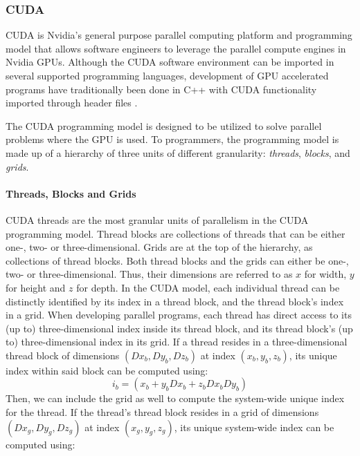 \subsubsection{CUDA} \label{background:graphical_processing_units:cuda}

CUDA \cite{cuda} is Nvidia's general purpose parallel computing platform and programming model that allows software engineers to leverage the parallel compute engines in Nvidia GPUs.
Although the CUDA software environment can be imported in several supported programming languages, development of GPU accelerated programs have traditionally been done in C++ with CUDA functionality imported through header files \cite{cuda}.

The CUDA programming model is designed to be utilized to solve parallel problems where the GPU is used.
To programmers, the programming model is made up of a hierarchy of three units of different granularity: \textit{threads}, \textit{blocks}, and \textit{grids}.

\paragraph{Threads, Blocks and Grids}
CUDA threads are the most granular units of parallelism in the CUDA programming model.
Thread blocks are collections of threads that can be either one-, two- or three-dimensional.
Grids are at the top of the hierarchy, as collections of thread blocks.
Both thread blocks and the grids can either be one-, two- or three-dimensional.
Thus, their dimensions are referred to as $x$ for width, $y$ for height and $z$ for depth.
In the CUDA model, each individual thread can be distinctly identified by its index in a thread block, and the thread block's index in a grid.
When developing parallel programs, each thread has direct access to its (up to) three-dimensional index inside its thread block, and its thread block's (up to) three-dimensional index in its grid.
If a thread resides in a three-dimensional thread block of dimensions $(Dx_b, Dy_b, Dz_b)$ at index $(x_b, y_b, z_b)$, its unique index within said block can be computed using:
\begin{equation}
  i_b = (x_b + y_bDx_b + z_bDx_bDy_b)
\end{equation}
Then, we can include the grid as well to compute the system-wide unique index for the thread.
If the thread's thread block resides in a grid of dimensions $(Dx_g, Dy_g, Dz_g)$ at index $(x_g, y_g, z_g)$, its unique system-wide index can be computed using:


